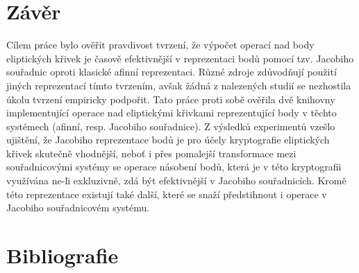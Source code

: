\documentclass{article}
\theoremstyle{definition}
\begin{document}
\section{Závěr}
Cílem práce bylo ověřit pravdivost tvrzení, že výpočet operací nad body eliptických křivek je časově efektivnější v reprezentaci bodů pomocí tzv. Jacobiho souřadnic oproti klasické afinní reprezentaci. Různé zdroje zdůvodňují použití jiných reprezentací tímto tvrzením, avšak žádná z nalezených studií se nezhostila úkolu tvrzení empiricky podpořit. Tato práce proti sobě ověřila dvě knihovny implementující operace nad eliptickými křivkami reprezentující body v těchto systémech (afinní, resp. Jacobiho souřadnice). Z výsledků experimentů vzešlo ujištění, že Jacobiho reprezentace bodů je pro účely kryptografie eliptických křivek skutečně vhodnější, neboť i přes pomalejší transformace mezi souřadnicovými systémy se operace násobení bodů, která je v této kryptografii využívána ne-li exkluzivně, zdá být efektivnější v Jacobiho souřadnicích. Kromě této reprezentace existují také další, které se snaží předstihnout i operace v Jacobiho souřadnicovém systému.

\section{Bibliografie}
\printbibliography
\end{document}
